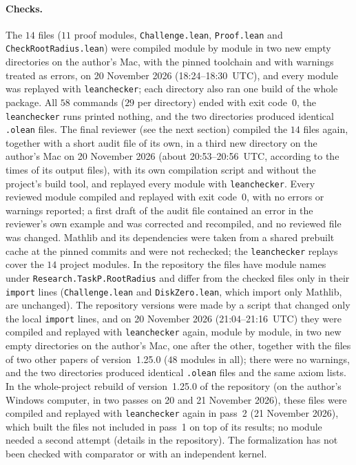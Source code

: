 \documentclass[11pt]{article}
\theoremstyle{definition}
\theoremstyle{remark}
\newcommand{\repoversion}{1.25.0}
\begin{document}
{\paragraph{Checks.}
The $14$ files ($11$ proof modules, \texttt{Challenge.lean},
\texttt{Proof.lean} and \texttt{CheckRootRadius.lean}) were compiled module
by module in two new empty directories on the author's Mac, with the pinned
toolchain and with warnings treated as errors, on 20 November 2026
(18:24--18:30~UTC), and every module was replayed with \texttt{leanchecker};
each directory also ran one build of the whole package. All $58$ commands
($29$ per directory) ended with exit code~$0$, the \texttt{leanchecker} runs
printed nothing, and the two directories produced identical \texttt{.olean}
files. The final reviewer (see the next section) compiled the $14$ files
again, together with a short audit file of its own, in a third new directory
on the author's Mac on 20 November 2026 (about 20:53--20:56~UTC, according to
the times of its output files), with its own compilation script and without
the project's build tool, and replayed every module with
\texttt{leanchecker}. Every reviewed module compiled and replayed with exit
code~$0$, with no errors or warnings reported; a first draft of the audit
file contained an error in the reviewer's own example and was corrected and
recompiled, and no reviewed file was changed. Mathlib and its dependencies
were taken from a shared prebuilt cache at the pinned commits and were not
rechecked; the \texttt{leanchecker} replays cover the $14$ project modules.
In the repository the files have module names under
\texttt{Research.TaskP.RootRadius} and differ from the checked files only in
their \texttt{import} lines (\texttt{Challenge.lean} and
\texttt{DiskZero.lean}, which import only Mathlib, are unchanged).
The repository versions were made by a script that changed only the local \texttt{import} lines, and on 20 November 2026 (21:04--21:16~UTC) they were compiled and replayed with \texttt{leanchecker} again, module by module, in two new empty directories on the author's Mac, one after the other, together with the files of two other papers of version~\repoversion{} ($48$ modules in all); there were no warnings, and the two directories produced identical \texttt{.olean} files and the same axiom lists. In the whole-project rebuild of version~\repoversion{} of the repository (on the author's Windows computer, in two passes on 20 and 21 November 2026), these files were compiled and replayed with \texttt{leanchecker} again in pass~2 (21 November 2026), which built the files not included in pass~1 on top of its results; no module needed a second attempt (details in the repository). The formalization has not been checked with
comparator or with an independent kernel.

\par}
\end{document}

